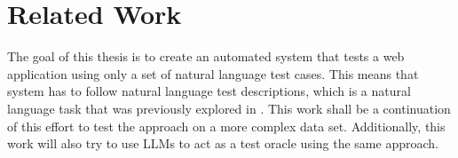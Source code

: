 
\chapter{Related Work}
\label{ch:FirstContent}

The goal of this thesis is to create an automated system that tests a web application using only a set of natural language test cases.
This means that system has to follow natural language test descriptions, which is a natural language task that was previously explored in \cite{GPT3Testing}.
This work shall be a continuation of this effort to test the approach on a more complex data set.
Additionally, this work will also try to use LLMs to act as a test oracle using the same approach.

